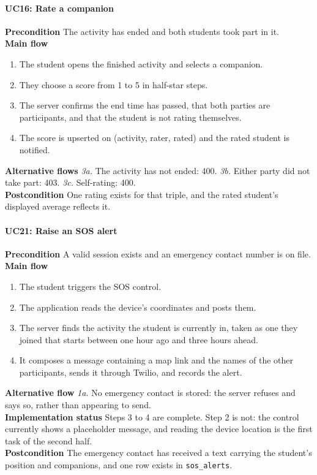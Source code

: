 \documentclass{tietreport}
\begin{document}
\paragraph{UC16: Rate a companion}
\textbf{Precondition} The activity has ended and both students took part in it.\\
\textbf{Main flow}
\begin{enumerate}[nosep]
  \item The student opens the finished activity and selects a companion.
  \item They choose a score from 1 to 5 in half-star steps.
  \item The server confirms the end time has passed, that both parties are participants,
        and that the student is not rating themselves.
  \item The score is upserted on (activity, rater, rated) and the rated student is
        notified.
\end{enumerate}
\textbf{Alternative flows} \emph{3a.} The activity has not ended: 400. \emph{3b.} Either
party did not take part: 403. \emph{3c.} Self-rating: 400.\\
\textbf{Postcondition} One rating exists for that triple, and the rated student's
displayed average reflects it.

\paragraph{UC21: Raise an SOS alert}
\textbf{Precondition} A valid session exists and an emergency contact number is on file.\\
\textbf{Main flow}
\begin{enumerate}[nosep]
  \item The student triggers the SOS control.
  \item The application reads the device's coordinates and posts them.
  \item The server finds the activity the student is currently in, taken as one they
        joined that starts between one hour ago and three hours ahead.
  \item It composes a message containing a map link and the names of the other
        participants, sends it through Twilio, and records the alert.
\end{enumerate}
\textbf{Alternative flow} \emph{1a.} No emergency contact is stored: the server refuses
and says so, rather than appearing to send.\\
\textbf{Implementation status} Steps 3 to 4 are complete. Step 2 is not: the control
currently shows a placeholder message, and reading the device location is the first
task of the second half.\\
\textbf{Postcondition} The emergency contact has received a text carrying the student's
position and companions, and one row exists in \texttt{sos\_alerts}.
\end{document}
